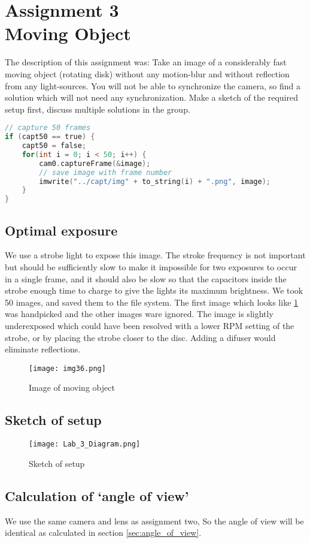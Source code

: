 \section {Assignment 3 \\ {Moving Object}}
\label {sec:assignment_3}

The description of this assignment was: Take an image of a considerably fast moving object (rotating disk) without any motion-blur and without reflection from any light-sources. You will not be able to synchronize the camera, so find a solution which will not need any synchronization.
Make a sketch of the required setup first, discuss multiple solutions in the group. \cite{Lab_Assignments}

\begin{lstlisting}[language=C, caption=save image to file, label=lst:50loop]
// capture 50 frames
if (capt50 == true) {
    capt50 = false;
    for(int i = 0; i < 50; i++) {
        cam0.captureFrame(&image);
        // save image with frame number
        imwrite("../capt/img" + to_string(i) + ".png", image);
    }
}
\end{lstlisting}


\subsection{Optimal exposure}

We use a strobe light to expose this image. The stroke frequency is not important but should be sufficiently slow to make it impossible for two exposures to occur in a single frame, and it should also be slow so that the capacitors inside the strobe enough time to charge to give the lights its maximum brightness. We took 50 images, and saved them to the file system. The first image which looks like \ref{fig:img36} was handpicked and the other images ware ignored. The image is slightly underexposed which could have been resolved with a lower RPM setting of the strobe, or by placing the strobe closer to the disc. Adding a difuser would eliminate reflections.

\begin{figure}[h!]
    \centering
    \texttt{[image: img36.png]}
    \caption{Image of moving object}
    \label{fig:img36}
\end{figure}

\subsection{Sketch of setup}

\begin{figure}[h!]
    \centering
    \texttt{[image: Lab\_3\_Diagram.png]}
    \caption{Sketch of setup}
    \label{fig:Lab_3_Diagram}
\end{figure}

\subsection{Calculation of ‘angle of view’}

We use the same camera and lens as assignment two, So the angle of view will be identical as calculated in section \ref{sec:angle_of_view}.

